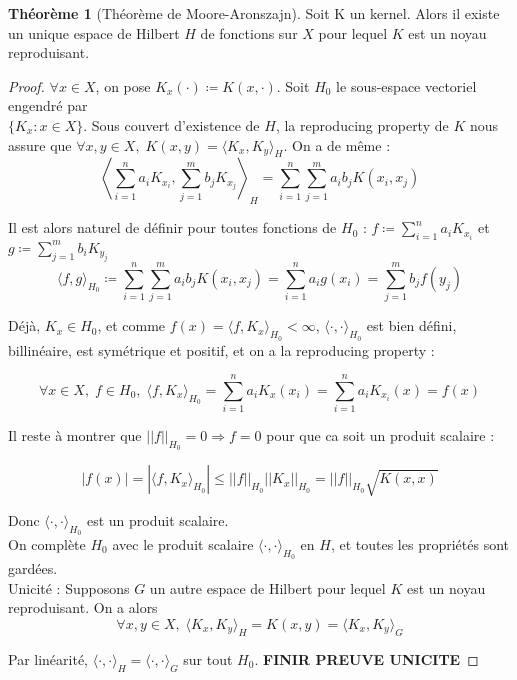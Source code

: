 \documentclass[a4paper, 11pt, french]{article}
\theoremstyle{definition}
\newtheorem{theorem}{Théorème}
\begin{document}
	\begin{theorem}[Théorème de Moore-Aronszajn]
	 	Soit K un kernel. Alors il existe un unique espace de Hilbert $H$ de fonctions sur $X$ pour lequel $K$ est un noyau reproduisant.
	\end{theorem}
	\begin{proof}
		$\forall x \in X$, on pose $K_x(\cdot) \coloneqq K(x, \cdot)$. Soit $H_0$ le sous-espace vectoriel engendré par \\ $\{K_x : x \in X\}$. Sous couvert d'existence de $H$, la reproducing property de $K$ nous assure que $\forall x, y \in X, \; K(x, y) = \langle K_x, K_y \rangle_H$. On a de même :
		\[\left\langle \sum_{i=1}^{n} a_i K_{x_i}, \sum_{j=1}^{m} b_j K_{x_j} \right\rangle_H = \sum_{i=1}^{n} \sum_{j=1}^{m} a_i b_j K(x_i, x_j)\]
		
		Il est alors naturel de définir pour toutes fonctions de $H_0$ : $f \coloneqq \sum_{i=1}^n a_i K_{x_i}$ et $g \coloneqq \sum_{j=1}^m b_i K_{y_j}$ 
		\[\langle f, g \rangle_{H_0} \coloneqq \sum_{i=1}^{n} \sum_{j=1}^{m} a_i b_j K(x_i, x_j) = \sum_{i=1}^n a_i g(x_i) = \sum_{j=1}^m b_j f(y_j)\]
		
		Déjà, $K_x \in H_0$, et comme $f(x) = \langle f, K_x \rangle_{H_0} < \infty$, $\langle \cdot, \cdot \rangle_{H_0}$ est bien défini, billinéaire, est symétrique et positif, et on a la reproducing property :
		
		\[\forall x \in X, \; f \in H_0, \; \langle f, K_x \rangle_{H_0} = \sum_{i=1}^n a_i K_x(x_i) = \sum_{i=1}^n a_i K_{x_i}(x) = f(x)\]
		
		Il reste à montrer que $||f||_{H_0} = 0 \Rightarrow f = 0$ pour que ca soit un produit scalaire :
		
		\[|f(x)| = |\langle f, K_x \rangle_{H_0}| \leq ||f||_{H_0} ||K_x||_{H_0} = ||f||_{H_0} \sqrt{K(x,x)} \]
		
		Donc $\langle \cdot, \cdot \rangle_{H_0}$ est un produit scalaire. \\
		
		On complète $H_0$ avec le produit scalaire $\langle \cdot, \cdot \rangle_{H_0}$ en $H$, et toutes les propriétés sont gardées. \\
		
		Unicité : Supposons $G$ un autre espace de Hilbert pour lequel $K$ est un noyau reproduisant. On a alors  
		\[\forall x, y \in X, \; \langle K_x, K_y \rangle_H = K(x, y) = \langle K_x, K_y \rangle_G\]
		
		Par linéarité, $\langle \cdot, \cdot \rangle_H = \langle \cdot, \cdot \rangle_G$ sur tout $H_0$. {\bf FINIR PREUVE UNICITE}
	\end{proof}
	
\end{document}
